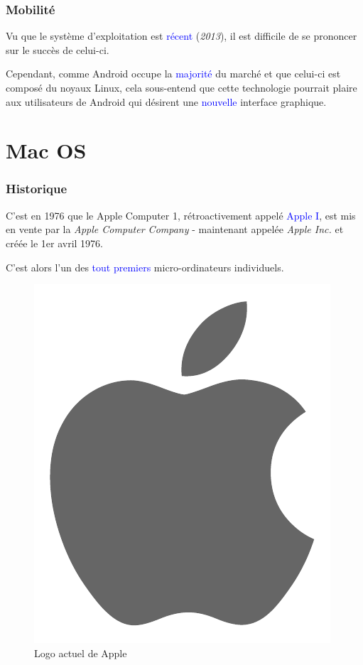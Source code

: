 \documentclass[aspectratio=169]{beamer}
\begin{document}
\begin{frame}
  \frametitle{Mobilité}
  Vu que le système d'exploitation est \textcolor{blue}{récent} (\textit{2013}),
  il est difficile de se prononcer sur le succès de celui-ci.

  \hspace{0.5cm}

  Cependant, comme Android occupe la \textcolor{blue}{majorité} du marché et
que celui-ci est composé du noyaux Linux, cela sous-entend que cette
technologie pourrait plaire aux utilisateurs de Android qui désirent une
\textcolor{blue}{nouvelle} interface graphique.
\end{frame}

\section{Mac OS}
\begin{frame}
  \frametitle{Historique}
  C'est en 1976 que le Apple Computer 1, rétroactivement appelé
  \textcolor{blue}{Apple I}, est mis en vente par la \textit{Apple Computer
    Company}  - maintenant appelée \textit{Apple Inc.} et créée le 1er avril 1976.

  \hspace{0.5cm}

  C'est alors l'un des \textcolor{blue}{tout premiers} micro-ordinateurs
  individuels.

  \begin{figure}[!h]
    \centering
    \includegraphics[scale=0.3]
    {textures/images/mac/historic/logo_apple.pdf}
    \caption{Logo actuel de Apple}
  \end{figure}
\end{frame}
\end{document}

